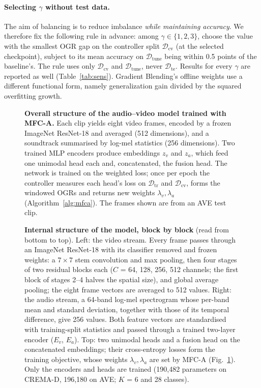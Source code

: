 \documentclass[fleqn,10pt]{wlscirep}
\begin{document}
\paragraph{Selecting $\gamma$ without test data.} The aim of balancing is to reduce imbalance \emph{while maintaining accuracy}. We therefore fix the following rule in advance: among $\gamma\in\{1,2,3\}$, choose the value with the smallest OGR gap on the controller split $\mathcal{D}_{\mathrm{cv}}$ (at the selected checkpoint), subject to its mean accuracy on $\mathcal{D}_{\mathrm{tune}}$ being within 0.5 points of the baseline's. The rule uses only $\mathcal{D}_{\mathrm{cv}}$ and $\mathcal{D}_{\mathrm{tune}}$, never $\mathcal{D}_{\mathrm{te}}$. Results for every $\gamma$ are reported as well (Table~\ref{tab:sens}). Gradient Blending's offline weights\cite{wang2020makes} use a different functional form, namely generalization gain divided by the squared overfitting growth.

\begin{figure}[tbp]
\centering
\resizebox{\textwidth}{!}{}
\caption{\textbf{Overall structure of the audio--video model trained with MFC-A.} Each clip yields eight video frames, encoded by a frozen ImageNet ResNet-18 and averaged (512 dimensions), and a soundtrack summarised by log-mel statistics (256 dimensions). Two trained MLP encoders produce embeddings $z_v$ and $z_a$, which feed one unimodal head each and, concatenated, the fusion head. The network is trained on the weighted loss; once per epoch the controller measures each head's loss on $\mathcal{D}_{\mathrm{tr}}$ and $\mathcal{D}_{\mathrm{cv}}$, forms the windowed OGRs and returns new weights $\lambda_v,\lambda_a$ (Algorithm~\ref{alg:mfca}). The frames shown are from an AVE test clip.}
\label{fig:arch}
\end{figure}

\begin{figure}[p]
\centering
\resizebox*{!}{0.84\textheight}{}
\caption{\textbf{Internal structure of the model, block by block} (read from bottom to top). Left: the video stream. Every frame passes through an ImageNet ResNet-18 with its classifier removed and frozen weights: a $7{\times}7$ stem convolution and max pooling, then four stages of two residual blocks each ($C$ = 64, 128, 256, 512 channels; the first block of stages 2--4 halves the spatial size), and global average pooling; the eight frame vectors are averaged to 512 values. Right: the audio stream, a 64-band log-mel spectrogram whose per-band mean and standard deviation, together with those of its temporal difference, give 256 values. Both feature vectors are standardised with training-split statistics and passed through a trained two-layer encoder ($E_v$, $E_a$). Top: two unimodal heads and a fusion head on the concatenated embeddings; their cross-entropy losses form the training objective, whose weights $\lambda_v,\lambda_a$ are set by MFC-A (Fig.~\ref{fig:arch}). Only the encoders and heads are trained (190,482 parameters on CREMA-D, 196,180 on AVE; $K$ = 6 and 28 classes).}
\label{fig:archdetail}
\end{figure}
\end{document}
